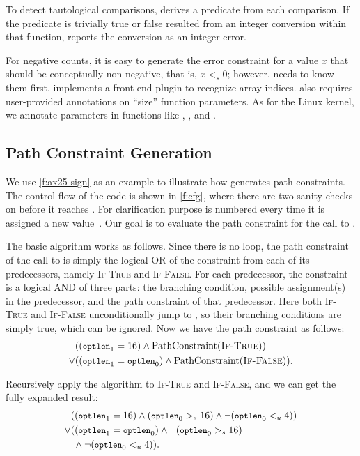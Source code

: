 To detect tautological comparisons, \sys derives a predicate from
each comparison.  If the predicate is trivially true or false
resulted from an integer conversion within that function, \sys
reports the conversion as an integer error.

For negative counts, it is easy to generate the error constraint
for a value $x$ that should be conceptually non-negative, that is,
$x <_s 0$; however, \sys needs to know them first.  \sys implements
a front-end plugin to recognize array indices.  \sys also requires
user-provided annotations on ``size'' function parameters.  As for
the Linux kernel, we annotate parameters in functions like ,
, and .

\subsection{Path Constraint Generation}

We use \autoref{f:ax25-sign} as an example to illustrate how \sys
generates path constraints.  The control flow of the code is shown
in \autoref{f:cfg}, where there are two sanity checks on 
before it reaches .  For clarification purpose
 is numbered every time it is assigned a new
value~\cite[\chapterautorefname~8.11]{whale}.  Our goal is to
evaluate the path constraint for the call to .

The basic algorithm works as follows.  Since there is no loop, the
path constraint of the call to  is simply the
logical OR of the constraint from each of its predecessors, namely
\textsc{If-True} and \textsc{If-False}.  For each predecessor, the
constraint is a logical AND of three parts: the branching condition,
possible assignment(s) in the predecessor, and the path constraint
of that predecessor.  Here both \textsc{If-True} and \textsc{If-False}
unconditionally jump to , so their branching
conditions are simply true, which can be ignored.  Now we have the
path constraint as follows:
\newcommand{\optlen}{{\small \texttt{optlen}}}
\newcommand{\pc}{\textrm{PathConstraint}}
%
\begin{align*}
& ((\optlen_1 = 16) \land \pc(\textsc{If-True})) \\
\lor & ((\optlen_1 = \optlen_0) \land \pc(\textsc{If-False})).
\end{align*}

Recursively apply the algorithm to \textsc{If-True} and \textsc{If-False},
and we can get the fully expanded result:
%
\begin{align*}
& ((\optlen_1 = 16) \land (\optlen_0 >_s 16)
    \land \neg(\optlen_0 <_u 4)) \\
\lor & ((\optlen_1 = \optlen_0) \land \neg(\optlen_0 >_s 16) \\
     & \; \land \neg(\optlen_0 <_u 4)).
\end{align*}

